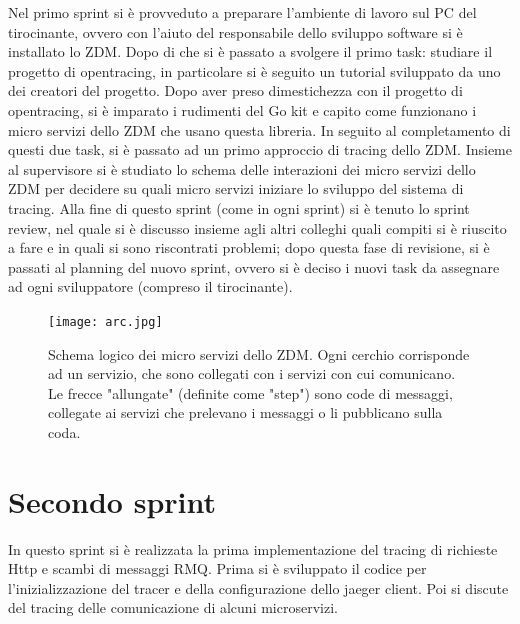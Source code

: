 \documentclass[a4paper,12pt,titlepage,italian,openany]{report}
\begin{document}
Nel primo sprint si è provveduto a preparare l'ambiente di lavoro sul PC del tirocinante, ovvero con l'aiuto del responsabile dello sviluppo software si è installato lo ZDM\cite{zdm:1}. Dopo di che si è passato a svolgere il primo task: studiare il progetto di opentracing\cite{opentracing:1}, in particolare
si è seguito un tutorial\cite{opentracing:2} sviluppato da uno dei creatori del progetto. Dopo aver preso dimestichezza con il progetto di opentracing\cite{opentracing:1}, si è imparato i rudimenti del Go kit e capito come funzionano i micro servizi dello ZDM che usano questa libreria.
In seguito al completamento di questi due task, si è passato ad un primo approccio di tracing dello ZDM.
Insieme al supervisore si è studiato lo schema delle interazioni dei micro servizi dello ZDM\cite{zdm:1} per decidere su quali micro servizi iniziare lo sviluppo del sistema di tracing.
Alla fine di questo sprint (come in ogni sprint) si è tenuto lo sprint review, nel quale si è discusso insieme agli altri colleghi quali compiti si è  riuscito a fare e in quali si sono riscontrati problemi; dopo questa fase di revisione, si è passati al planning del nuovo sprint, ovvero si è deciso i nuovi task da assegnare ad ogni sviluppatore (compreso il tirocinante).
\begin{figure}[H]
    \texttt{[image: arc.jpg]}
    \centering
    \caption{Schema logico dei micro servizi dello ZDM\cite{zdm:1}. Ogni cerchio corrisponde ad un servizio, che sono collegati con i servizi con cui comunicano. Le frecce "allungate" (definite come "step") sono code di messaggi, collegate ai servizi che prelevano i messaggi o li pubblicano sulla coda.}
\end{figure}  

\newpage
\section{Secondo sprint}
In questo sprint si è realizzata la prima implementazione del tracing di richieste Http e scambi di messaggi RMQ\cite{rabbit:1}. Prima si 
è sviluppato il codice per l'inizializzazione del tracer e della configurazione dello jaeger client. Poi si discute del tracing delle comunicazione di alcuni microservizi.
\end{document}
